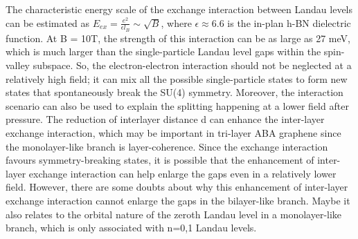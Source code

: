The characteristic energy scale of the exchange interaction between Landau levels can be estimated as $E_{ex} = \frac{e^2}{\epsilon l_B}\sim\sqrt B$, 
where $\epsilon\approx 6.6$ is the in-plan h-BN dielectric function.
At B = 10T, the strength of this interaction can be as large as 27 meV, which is much larger than the single-particle Landau level gaps within the spin-valley subspace. 
So, the electron-electron interaction should not be neglected at a relatively high field; it can mix all the possible single-particle states to form new states that spontaneously break the SU(4) symmetry. 
Moreover, the interaction scenario can also be used to explain the splitting happening at a lower field after pressure. 
The reduction of interlayer distance d can enhance the inter-layer exchange interaction, which may be important in tri-layer ABA graphene since the monolayer-like branch is layer-coherence.
Since the exchange interaction favours symmetry-breaking states, 
it is possible that the enhancement of inter-layer exchange interaction can help enlarge the gaps even in a relatively lower field.
However, there are some doubts about why this enhancement of inter-layer exchange interaction cannot enlarge the gaps in the bilayer-like branch. 
Maybe it also relates to the orbital nature of the zeroth Landau level in a monolayer-like branch, which is only associated with n=0,1 Landau levels.
